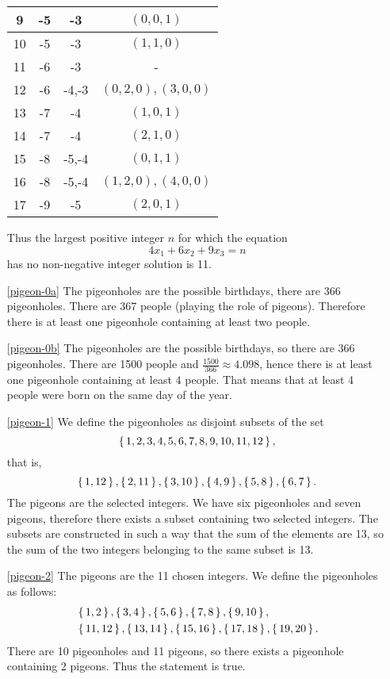 \begin{enumerate}
\begin{center}
\begin{tabular}{|c|c|c|c|}
\hline
9 & -5 & -3 & $(0,0,1)$\\
\hline
10 & -5 & -3 & $(1,1,0)$\\
\hline
11 & -6 & -3 & -\\
\hline
12 & -6 & -4,-3 & $(0,2,0),(3,0,0)$\\
\hline
13 & -7 & -4 & $(1,0,1)$\\
\hline
14 & -7 & -4 & $(2,1,0)$\\
\hline
15 & -8 & -5,-4 & $(0,1,1)$\\
\hline
16 & -8 & -5,-4 & $(1,2,0),(4,0,0)$\\
\hline
17 & -9 & -5 & $(2,0,1)$\\
\hline
\end{tabular}
\end{center}
Thus the largest positive integer $n$ for which the equation 
$$
4x_1+6x_2+9x_3=n
$$
has no non-negative integer solution is 11.


\item[\ref{pigeon-0a}] The pigeonholes are the possible birthdays, there are 366 pigeonholes.
There are 367 people (playing the role of pigeons). Therefore there is at least one pigeonhole
containing at least two people.

\item[\ref{pigeon-0b}] The pigeonholes are the possible birthdays, so there are 366 pigeonholes.
There are 1500 people and $\frac{1500}{366}\approx 4.098$, hence there is at least one pigeonhole containing at least
4 people. That means that at least 4 people were born on the same day of the year.

\item[\ref{pigeon-1}] We define the pigeonholes as disjoint subsets of the set 
$$\left\{\,1,2,3,4,5,6,7,8,9,10,11,12\,\right\},$$
that is, 
$$
\left\{\,1,12\,\right\},\left\{\,2,11\,\right\},\left\{\,3,10\,\right\},\left\{\,4,9\,\right\},\left\{\,5,8\,\right\},\left\{\,6,7\,\right\}.
$$
The pigeons are the selected integers. We have six pigeonholes and seven pigeons, therefore there exists
a subset containing two selected integers. The subsets are constructed in such a way that the sum of the elements
are 13, so the sum of the two integers belonging to the same subset is 13. 

\item[\ref{pigeon-2}] The pigeons are the 11 chosen integers. We define the pigeonholes as follows: 
\begin{align*}
& \left\{\,1,2\,\right\},\left\{\,3,4\,\right\},\left\{\,5,6\,\right\},\left\{\,7,8\,\right\},\left\{\,9,10\,\right\},\\
& \left\{\,11,12\,\right\},\left\{\,13,14\,\right\},\left\{\,15,16\,\right\},\left\{\,17,18\,\right\},\left\{\,19,20\,\right\}.
\end{align*}
There are 10 pigeonholes and 11 pigeons, so there exists a pigeonhole containing 2 pigeons.
Thus the statement is true.


\end{enumerate}
